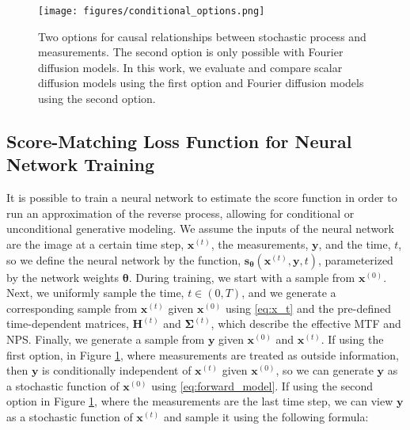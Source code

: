 \documentclass[12pt,]{article}
\begin{document}
\begin{figure}[h!]
    \centering
    \texttt{[image: figures/conditional\_options.png]}
    \caption{Two options for causal relationships between stochastic process and measurements. The second option is only possible with Fourier diffusion models. In this work, we evaluate and compare scalar diffusion models using the first option and Fourier diffusion models using the second option. }
    \label{fig:conditional_options}
\end{figure}




\subsection{Score-Matching Loss Function for Neural Network Training}

\noindent It is possible to train a neural network to estimate the score function in order to run an approximation of the reverse process, allowing for conditional or unconditional generative modeling. We assume the inputs of the neural network are the image at a certain time step, $\mathbf{x}^{(t)}$, the measurements, $\mathbf{y}$, and the time, $t$, so we define the neural network by the function, $\mathbf{s}_{\boldsymbol{\theta}}(\mathbf{x}^{(t)}, \mathbf{y}, t)$, parameterized by the network weights $\boldsymbol{\theta}$. During training, we start with a sample from $\mathbf{x}^{(0)}$. Next, we uniformly sample the time, $t\in (0,T)$, and we generate a corresponding sample from $\mathbf{x}^{(t)}$ given $\mathbf{x}^{(0)}$ using \eqref{eq:x_t} and the pre-defined time-dependent matrices, $\mathbf{H}^{(t)}$ and $\boldsymbol{\Sigma}^{(t)}$, which describe the effective MTF and NPS. Finally, we generate a sample from $\mathbf{y}$ given $\mathbf{x}^{(0)}$ and $\mathbf{x}^{(t)}$. If using the first option, in Figure \ref{fig:conditional_options}, where measurements are treated as outside information, then $\mathbf{y}$ is conditionally independent of $\mathbf{x}^{(t)}$ given $\mathbf{x}^{(0)}$, so we can generate $\mathbf{y}$ as a stochastic function of $\mathbf{x}^{(0)}$ using \eqref{eq:forward_model}. If using the second option in Figure \ref{fig:conditional_options}, where the measurements are the last time step, we can view $\mathbf{y}$ as a stochastic function of $\mathbf{x}^{(t)}$ and sample it using the following formula:
\end{document}
